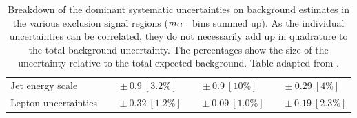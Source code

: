 \begin{table}
\begin{center}
{\begin{tabular*}{\textwidth}{lccc}
Jet energy scale         & $~~~\pm 0.9\ [3.2\%] $          & $~\pm 0.9\ [10\%] $          & $~\pm 0.29\ [4\%] $       \\
Lepton uncertainties         & $~~~~~\pm 0.32\ [1.2\%] $          & $~~~~\pm 0.09\ [1.0\%] $          & $~~~~\pm 0.19\ [2.3\%] $   \\
\bottomrule
\end{tabular*}}
\end{center}
\caption[Breakdown of uncertainty on background estimates]{
Breakdown of the dominant systematic uncertainties on background estimates in the various exclusion signal regions ($m_{\textrm{CT}}$ bins summed up).
As the individual uncertainties can be correlated, they do not necessarily add up in quadrature to 
the total background uncertainty. The percentages show the size of the uncertainty relative to the total expected background. Table adapted from \cite{SUSY-2019-08}.}
\label{tab:systematics_summary}
\end{table}




